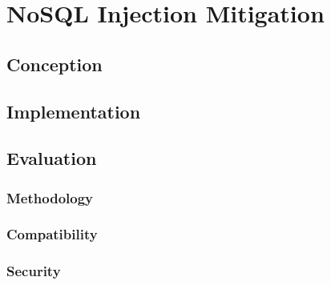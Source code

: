 \chapter{NoSQL Injection Mitigation}

\section{Conception}

\section{Implementation}

\section{Evaluation}
\label{sec:evaluation}

\subsection{Methodology}

\subsection{Compatibility}

\subsection{Security}
